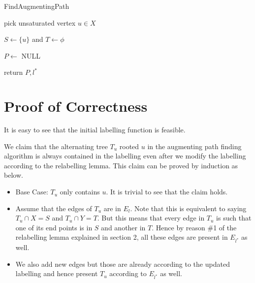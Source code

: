 \documentclass{article}
\begin{document}
\begin{algorithm}[!h]
\caption{FindAugmentingPath}

pick unsaturated vertex $u \in X$

$S \leftarrow \{u\}$ and $T \leftarrow \phi$

$P \leftarrow$ NULL

return $P, l^*$
\end{algorithm}

\section{Proof of Correctness}
It is easy to see that the initial labelling function is feasible. 

We claim that the alternating tree $T_u$ rooted $u$ in the augmenting path finding algorithm is always contained in the labelling even after we modify the labelling according to the relabelling lemma. This claim can be proved by induction as below.
\begin{itemize}
    \item Base Case: $T_u$ only contains $u$. It is trivial to see that the claim holds.
    \item Assume that the edges of $T_u$ are in $E_l$. Note that this is equivalent to saying $T_u \cap X = S$ and $T_u \cap Y = T$. But this means that every edge in $T_u$ is such that one of its end points is in $S$ and another in $T$. Hence by reason \#1 of the relabelling lemma explained in section 2, all these edges are present in $E_{l^*}$ as well.
    \item We also add new edges but those are already according to the updated labelling and hence present $T_u$ according to $E_{l^*}$ as well.
\end{itemize}
\end{document}
